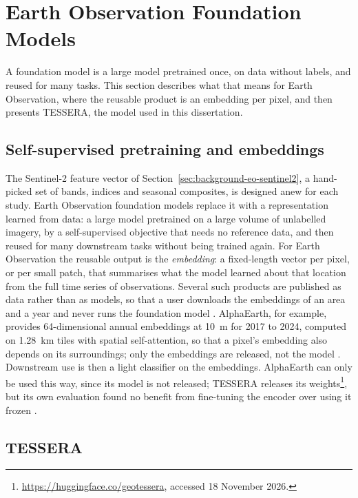 \section{Earth Observation Foundation Models}
\label{sec:background-fm}

A foundation model is a large model pretrained once, on data without
labels, and reused for many tasks. This section describes what that
means for Earth Observation, where the reusable product is an
embedding per pixel, and then presents TESSERA, the model used in
this dissertation.

\subsection{Self-supervised pretraining and embeddings}
\label{sec:background-fm-embeddings}

The Sentinel-2 feature vector of
Section~\ref{sec:background-eo-sentinel2}, a hand-picked set of bands,
indices and seasonal composites, is designed anew for each study. Earth Observation foundation models
replace it with a representation learned from data: a large model
pretrained on a large volume of unlabelled imagery, by a
self-supervised objective that needs no reference data, and then
reused for many downstream tasks without being trained again. For
Earth Observation the reusable output is the \emph{embedding}: a
fixed-length vector per pixel, or per small patch, that summarises
what the model learned about that location from the full time series
of observations. Several such products are published as data rather
than as models, so that a user downloads the embeddings of an area and
a year and never runs the foundation model \cite{stewart2026}. AlphaEarth,
for example, provides 64-dimensional annual embeddings at 10~m for
2017 to 2024, computed on 1.28~km tiles with spatial self-attention,
so that a pixel's embedding also depends on its surroundings; only the
embeddings are released, not the model \cite{brown2025}. Downstream
use is then a light classifier on the embeddings. AlphaEarth can only
be used this way, since its model is not released; TESSERA releases
its weights\footnote{\url{https://huggingface.co/geotessera}, accessed
18 November 2026.}, but its own evaluation found no benefit from fine-tuning
the encoder over using it frozen \cite{feng2025}.

\subsection{TESSERA}
\label{sec:background-fm-tessera}

